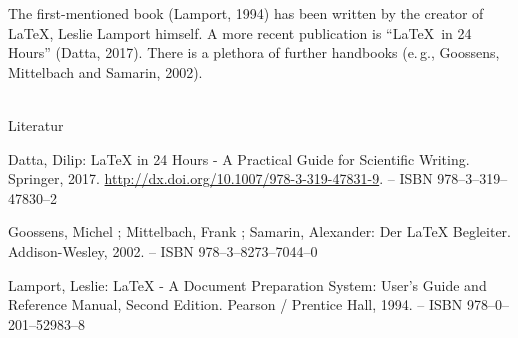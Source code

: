 The first-mentioned book (Lamport, 1994) has been written by the creator of \LaTeX{}, Leslie Lamport himself.
A more recent publication is \enquote{\LaTeX\ in 24 Hours} (Datta, 2017).
There is a plethora of further handbooks (e.\,g., Goossens, Mittelbach and Samarin, 2002).

~\\

\noindent Literatur

\noindent [Datta 2017] Datta, Dilip: LaTeX in 24 Hours - A Practical Guide for Scientific Writing. Springer, 2017. \url{http://dx.doi.org/10.1007/978-3-319-47831-9}. – ISBN 978–3–319–47830–2

\noindent [Goossens u. a. 2002] Goossens, Michel ; Mittelbach, Frank ; Samarin, Alexander: Der LaTeX Begleiter. Addison-Wesley, 2002. – ISBN 978–3–8273–7044–0

\noindent [Lamport 1994] Lamport, Leslie: LaTeX - A Document Preparation System: User’s Guide and Reference Manual, Second Edition. Pearson / Prentice Hall, 1994. – ISBN 978–0–201–52983–8
